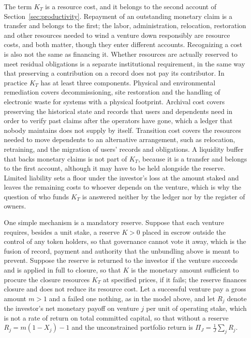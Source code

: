 \documentclass[11pt]{article}
\theoremstyle{remark}
\begin{document}
The term $K_T$ is a resource cost, and it belongs to the second account of Section~\ref{sec:productivity}. Repayment of an outstanding monetary claim is a transfer and belongs to the first; the labor, administration, relocation, restoration and other resources needed to wind a venture down responsibly are resource costs, and both matter, though they enter different accounts. Recognizing a cost is also not the same as financing it. Whether resources are actually reserved to meet residual obligations is a separate institutional requirement, in the same way that preserving a contribution on a record does not pay its contributor. In practice $K_T$ has at least three components. Physical and environmental remediation covers decommissioning, site restoration and the handling of electronic waste for systems with a physical footprint. Archival cost covers preserving the historical state and records that users and dependents need in order to verify past claims after the operators have gone, which a ledger that nobody maintains does not supply by itself. Transition cost covers the resources needed to move dependents to an alternative arrangement, such as relocation, retraining, and the migration of users' records and obligations. A liquidity buffer that backs monetary claims is not part of $K_T$, because it is a transfer and belongs to the first account, although it may have to be held alongside the reserve. Limited liability sets a floor under the investor's loss at the amount staked and leaves the remaining costs to whoever depends on the venture, which is why the question of who funds $K_T$ is answered neither by the ledger nor by the register of owners.

One simple mechanism is a mandatory reserve. Suppose that each venture requires, besides a unit stake, a reserve $K>0$ placed in escrow outside the control of any token holders, so that governance cannot vote it away, which is the fusion of record, payment and authority that the unbundling above is meant to prevent. Suppose the reserve is returned to the investor if the venture succeeds and is applied in full to closure, so that $K$ is the monetary amount sufficient to procure the closure resources $K_T$ at specified prices, if it fails; the reserve finances closure and does not reduce its resource cost. Let a successful venture pay a gross amount $m>1$ and a failed one nothing, as in the model above, and let $R_j$ denote the investor's net monetary payoff on venture $j$ per unit of operating stake, which is not a rate of return on total committed capital, so that without a reserve $R_j=m(1-X_j)-1$ and the unconstrained portfolio return is $\Pi_J=\tfrac1J\sum_j R_j$.
\end{document}
